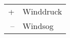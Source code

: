
\switchcolumn*
\begin{tabular}{ r @{ \dots} L{2.8cm} }
 + & Winddruck
\\
 -- & Windsog
\end{tabular}
\switchcolumn